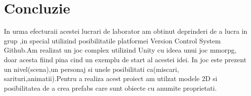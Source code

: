 \section*{Concluzie}
In urma efecturaii acestei lucrari de laborator am obtinut deprinderi de a lucra in grup ,in special utilizind posibilitatile platformei Version Control System Github.Am realizat un joc complex utilizind Unity cu ideea unui joc mmorpg, doar acesta fiind pina cind un exemplu de start al acestei idei. In joc este prezent un nivel(scena),un personaj si unele posibilitati ca(miscari, sarituri,animatii).Pentru a realiza acest proiect am utilzat modele 2D si posibilitatea de a crea prefabs care sunt obiecte cu anumite proprietati.

\clearpage